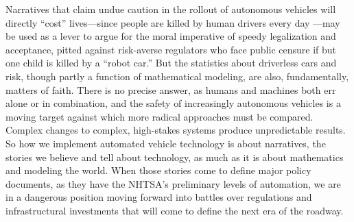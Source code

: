 
Narratives that claim undue caution in the
rollout of autonomous vehicles will directly ``cost'' lives---since
people are killed by human drivers every day \cite{driverlessfuture}
\cite{baileyReason} \cite{howardRobots}---may be used as a lever to
argue for the moral imperative of 
speedy legalization and acceptance, pitted against risk-averse regulators who face
public censure if but one child is killed by a
``robot car.'' But the statistics about driverless
cars and risk, though partly a function of mathematical modeling, are
also, fundamentally, matters of faith. There is no precise answer, as
humans and machines both err alone or in combination, and
the safety of increasingly autonomous vehicles is a moving target
against which more radical approaches must be compared.
Complex changes to complex, high-stakes systems produce unpredictable
results. So how we implement automated vehicle technology is
about narratives, the stories we believe and tell about technology, as
much as it is about mathematics and modeling the world. When those
stories come to define major policy documents, as they have the
NHTSA's preliminary levels of automation, we are in a dangerous
position moving forward into battles over regulations and
infrastructural investments that will come to define the next era of
the roadway.




